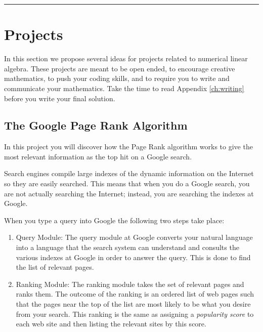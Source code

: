\documentclass[
]{book}
\theoremstyle{definition}
\theoremstyle{definition}
\theoremstyle{definition}
\theoremstyle{remark}
\begin{document}
\begin{center}\rule{0.5\linewidth}{0.5pt}\end{center}

\hypertarget{projects-2}{%
\section{Projects}\label{projects-2}}

In this section we propose several ideas for projects related to
numerical linear algebra. These projects are meant to be open ended, to
encourage creative mathematics, to push your coding skills, and to
require you to write and communicate your mathematics. Take the time to
read Appendix \ref{ch:writing} before you write your final solution.

\hypertarget{the-google-page-rank-algorithm}{%
\subsection{The Google Page Rank Algorithm}\label{the-google-page-rank-algorithm}}

In this project you will discover how the Page Rank algorithm works to
give the most relevant information as the top hit on a Google search.

Search engines compile large indexes of the dynamic information on the
Internet so they are easily searched. This means that when you do a
Google search, you are not actually searching the Internet; instead, you
are searching the indexes at Google.

When you type a query into Google the following two steps take place:

\begin{enumerate}
\def\labelenumi{\arabic{enumi}.}
\item
  Query Module: The query module at Google converts your natural
  language into a language that the search system can understand and
  consults the various indexes at Google in order to answer the query.
  This is done to find the list of relevant pages.
\item
  Ranking Module: The ranking module takes the set of relevant pages
  and ranks them. The outcome of the ranking is an ordered list of web
  pages such that the pages near the top of the list are most likely
  to be what you desire from your search. This ranking is the same as
  assigning a \emph{popularity score} to each web site and then listing the
  relevant sites by this score.
\end{enumerate}
\end{document}
